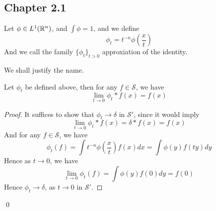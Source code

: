 \subsection{Chapter 2.1}
\begin{definition}
    Let $\phi\in L^1(\mathbb{R}^n)$, and $\int\phi=1$, and we define 
    \begin{equation*}
        \phi_t=t^{-n}\phi\left(\frac{x}{t} \right)
    \end{equation*} 
    And we call the family $\{\phi_t\}_{t>0}$ approxiation of the identity.
\end{definition}
We shall justify the name.
\begin{proposition}
    Let $\phi_t$ be defined above, then for any $f\in\mathcal{S}$, we have
    \begin{equation*}
        \lim_{t\to 0}\phi_t\ast f(x)=f(x)
    \end{equation*}
\end{proposition}
\begin{proof}
    It suffices to show that $\phi_t\to\delta$ in $\mathcal{S}'$, since it would imply
    \begin{equation*}
        \lim_{t\to 0}\phi_t\ast f(x)=\delta\ast f(x)=f(x)
    \end{equation*}
    And for any $f\in\mathcal{S}$, we have
    \begin{equation*}
        \phi_t(f)=\int t^{-n}\phi\left(\frac{x}{t}\right)f(x)dx=\int \phi(y)f(ty)dy
    \end{equation*}
    Hence as $t\to 0$, we have
    \begin{equation*}
        \lim_{t\to 0}\phi_t(f)=\int\phi(y)f(0)dy=f(0)
    \end{equation*}
    Hence $\phi_t\to\delta$, as $t\to 0$ in $\mathcal{S}'$.
\end{proof}
\qed


